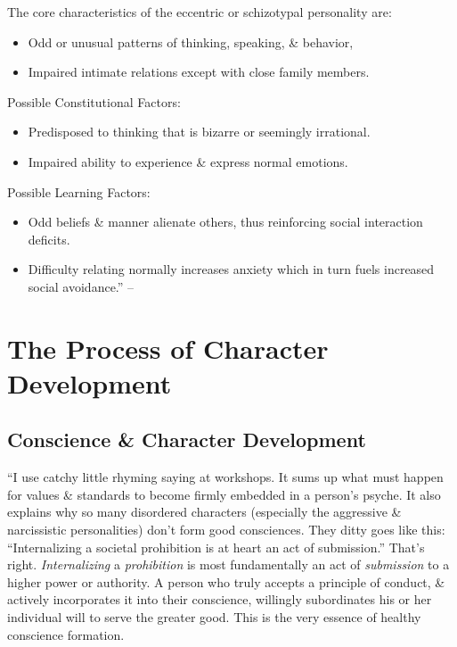 \documentclass{article}
\numberwithin{equation}{section}
\begin{document}
The core characteristics of the eccentric or schizotypal personality are:
\begin{itemize}
	\item Odd or unusual patterns of thinking, speaking, \& behavior,
	\item Impaired intimate relations except with close family members.
\end{itemize}
Possible Constitutional Factors:
\begin{itemize}
	\item Predisposed to thinking that is bizarre or seemingly irrational.
	\item Impaired ability to experience \& express normal emotions.
\end{itemize}
Possible Learning Factors:
\begin{itemize}
	\item Odd beliefs \& manner alienate others, thus reinforcing social interaction deficits.
	\item Difficulty relating normally increases anxiety which in turn fuels increased social avoidance.'' -- \cite[pp. 104--124]{Simon2011}
\end{itemize}


\section{The Process of Character Development}

\subsection{Conscience \& Character Development}
``I use catchy little rhyming saying at workshops. It sums up what must happen for values \& standards to become firmly embedded in a person's psyche. It also explains why so many disordered characters (especially the aggressive \& narcissistic personalities) don't form good consciences. They ditty goes like this: ``Internalizing a societal prohibition is at heart an act of submission.'' That's right. \textit{Internalizing} a \textit{prohibition} is most fundamentally an act of \textit{submission} to a higher power or authority. A person who truly accepts a principle of conduct, \& actively incorporates it into their conscience, willingly subordinates his or her individual will to serve the greater good. This is the very essence of healthy conscience formation.
\end{document}
